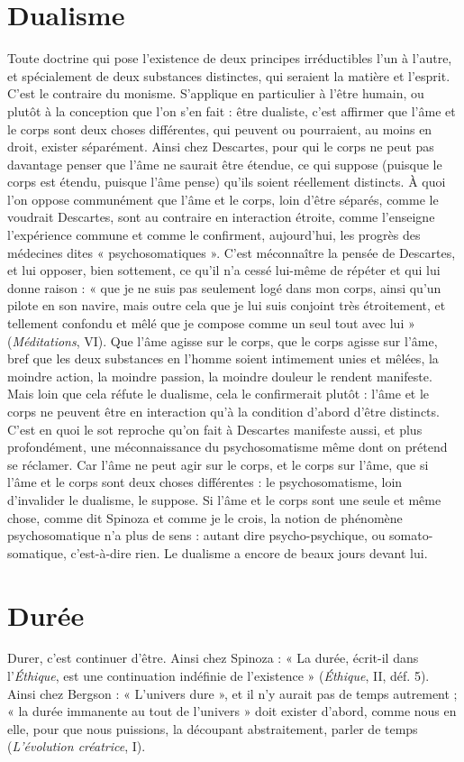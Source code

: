 \section{Dualisme}
Toute doctrine qui pose l’existence de deux principes irréductibles
l’un à l’autre, et spécialement de deux substances distinctes,
qui seraient la matière et l’esprit. C’est le contraire du monisme.
S’applique en particulier à l’être humain, ou plutôt à la conception que l’on
s’en fait : être dualiste, c’est affirmer que l’âme et le corps sont deux choses différentes,
qui peuvent ou pourraient, au moins en droit, exister séparément.
Ainsi chez Descartes, pour qui le corps ne peut pas davantage penser que l’âme
ne saurait être étendue, ce qui suppose (puisque le corps est étendu, puisque
l’âme pense) qu’ils soient réellement distincts. À quoi l’on oppose communément
que l’âme et le corps, loin d’être séparés, comme le voudrait Descartes,
sont au contraire en interaction étroite, comme l’enseigne l’expérience commune
et comme le confirment, aujourd’hui, les progrès des médecines dites
« psychosomatiques ». C’est méconnaître la pensée de Descartes, et lui
opposer, bien sottement, ce qu’il n’a cessé lui-même de répéter et qui lui donne
raison : « que je ne suis pas seulement logé dans mon corps, ainsi qu’un pilote
en son navire, mais outre cela que je lui suis conjoint très étroitement, et tellement
confondu et mêlé que je compose comme un seul tout avec lui » ({\it Méditations}, VI).
Que l'âme agisse sur le corps, que le corps agisse sur l’âme, bref que
les deux substances en l’homme soient intimement unies et mêlées, la moindre
action, la moindre passion, la moindre douleur le rendent manifeste. Mais loin
que cela réfute le dualisme, cela le confirmerait plutôt : l’âme et le corps ne
peuvent être en interaction qu’à la condition d’abord d’être distincts. C’est en
quoi le sot reproche qu’on fait à Descartes manifeste aussi, et plus profondément,
une méconnaissance du psychosomatisme même dont on prétend se
réclamer. Car l’âme ne peut agir sur le corps, et le corps sur l’âme, que si l’âme
et le corps sont deux choses différentes : le psychosomatisme, loin d’invalider le
dualisme, le suppose. Si l’âme et le corps sont une seule et même chose, comme
dit Spinoza et comme je le crois, la notion de phénomène psychosomatique n’a
plus de sens : autant dire psycho-psychique, ou somato-somatique, c’est-à-dire
rien. Le dualisme a encore de beaux jours devant lui.

\section{Durée}
Durer, c’est continuer d’être. Ainsi chez Spinoza : « La durée, écrit-il
dans l’{\it Éthique}, est une continuation indéfinie de l'existence »
({\it Éthique}, II, déf. 5). Ainsi chez Bergson : « L'univers dure », et il n’y aurait pas
de temps autrement ; « la durée immanente au tout de l’univers » doit exister
d’abord, comme nous en elle, pour que nous puissions, la découpant abstraitement,
parler de temps ({\it L'évolution créatrice}, I).

